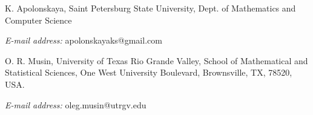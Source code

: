 \documentclass[a4paper,12pt]{article}
\begin{document}
 K. Apolonskaya, Saint Petersburg State University, Dept. of Mathematics and Computer Science
 
 {\it E-mail address:} apolonskayaks@gmail.com
 
 \medskip
 O. R. Musin,  University of Texas Rio Grande Valley, School of Mathematical and
 Statistical Sciences, One West University Boulevard, Brownsville, TX, 78520, USA.

 {\it E-mail address:} oleg.musin@utrgv.edu



\end{document}
